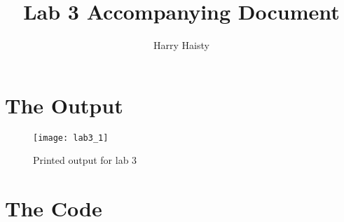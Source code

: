 \documentclass[11pt]{article}
\title{Lab 3 Accompanying Document}
\author{Harry Haisty}
\begin{document}
\maketitle

\section*{The Output}
\begin{figure}[H]
\centering

\texttt{[image: lab3\_1]}
\caption{Printed output for lab 3}
\end{figure}

\newpage
\section*{The Code}
\end{document}
